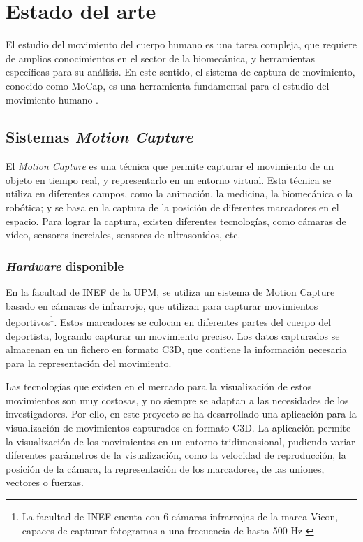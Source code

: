 \chapter{Estado del arte} \label{sec:cap2}

\noindent El estudio del movimiento del cuerpo humano es una tarea compleja, que requiere de amplios conocimientos en el sector de la biomecánica, y herramientas específicas para su análisis. En este sentido, el sistema de captura de movimiento, conocido como \ac{MoCap}, es una herramienta fundamental para el estudio del movimiento humano \autocite{taiQueEsMotion2024}.


\section{Sistemas \textit{Motion Capture}}
El \textit{Motion Capture} es una técnica que permite capturar el movimiento de un objeto en tiempo real, y representarlo en un entorno virtual. Esta técnica se utiliza en diferentes campos, como la animación, la medicina, la biomecánica o la robótica; y se basa en la captura de la posición de diferentes marcadores en el espacio. Para lograr la captura, existen diferentes tecnologías, como cámaras de vídeo, sensores inerciales, sensores de ultrasonidos, etc. \autocite{taiQueEsMotion2024}

\subsection{\textit{Hardware} disponible}
En la facultad de \ac{INEF} de la \ac{UPM}, se utiliza un sistema de Motion Capture basado en cámaras de infrarrojo, que utilizan para capturar movimientos deportivos\footnote{La facultad de INEF cuenta con 6 cámaras infrarrojas de la marca Vicon, capaces de capturar fotogramas a una frecuencia de hasta 500 Hz \autocite{FacultadCienciasActividad}}. Estos marcadores se colocan en diferentes partes del cuerpo del deportista, logrando capturar un movimiento preciso. Los datos capturados se almacenan en un fichero en formato \ac{C3D}, que contiene la información necesaria para la representación del movimiento. 

Las tecnologías que existen en el mercado para la visualización de estos movimientos son muy costosas, y no siempre se adaptan a las necesidades de los investigadores. Por ello, en este proyecto se ha desarrollado una aplicación para la visualización de movimientos capturados en formato \ac{C3D}. La aplicación permite la visualización de los movimientos en un entorno tridimensional, pudiendo variar diferentes parámetros de la visualización, como la velocidad de reproducción, la posición de la cámara, la representación de los marcadores, de las uniones, vectores o fuerzas.

